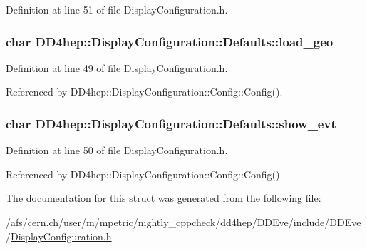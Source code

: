 Definition at line 51 of file DisplayConfiguration.h.\hypertarget{struct_d_d4hep_1_1_display_configuration_1_1_defaults_ad70e6ccfad33fb7a2282b01fb4118fc9}{
\subsubsection[{load\_\-geo}]{\setlength{\rightskip}{0pt plus 5cm}char {\bf DD4hep::DisplayConfiguration::Defaults::load\_\-geo}}}
\label{struct_d_d4hep_1_1_display_configuration_1_1_defaults_ad70e6ccfad33fb7a2282b01fb4118fc9}


Definition at line 49 of file DisplayConfiguration.h.

Referenced by DD4hep::DisplayConfiguration::Config::Config().\hypertarget{struct_d_d4hep_1_1_display_configuration_1_1_defaults_a63fc69fe802d80627939c1f00d188cde}{
\subsubsection[{show\_\-evt}]{\setlength{\rightskip}{0pt plus 5cm}char {\bf DD4hep::DisplayConfiguration::Defaults::show\_\-evt}}}
\label{struct_d_d4hep_1_1_display_configuration_1_1_defaults_a63fc69fe802d80627939c1f00d188cde}


Definition at line 50 of file DisplayConfiguration.h.

Referenced by DD4hep::DisplayConfiguration::Config::Config().

The documentation for this struct was generated from the following file:\begin{DoxyCompactItemize}
\item 
/afs/cern.ch/user/m/mpetric/nightly\_\-cppcheck/dd4hep/DDEve/include/DDEve/\hyperlink{_display_configuration_8h}{DisplayConfiguration.h}\end{DoxyCompactItemize}
